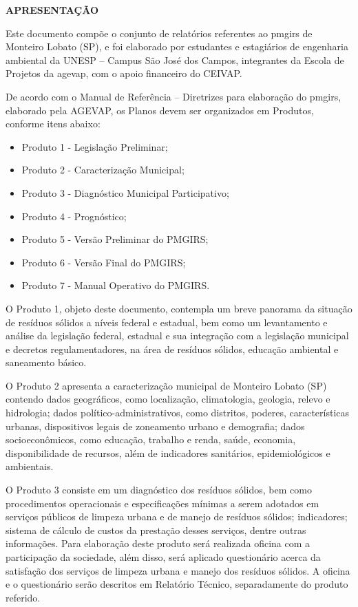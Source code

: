 \begin{center}
    {\bfseries\Large\MakeUppercase{Apresentação}}
\end{center}
Este documento compõe o conjunto de relatórios referentes ao \gls{pmgirs} de Monteiro Lobato (SP), e foi elaborado por estudantes e estagiários de engenharia ambiental da UNESP – Campus São José dos Campos, integrantes da Escola de Projetos da \gls{agevap}, com o apoio financeiro do CEIVAP.

De acordo com o Manual de Referência – Diretrizes para elaboração do \gls{pmgirs}, elaborado pela AGEVAP, os Planos devem ser organizados em Produtos, conforme itens abaixo:
\begin{itemize}
    \item {Produto 1 - Legislação Preliminar;}
    \item {Produto 2 - Caracterização Municipal;}
    \item {Produto 3 - Diagnóstico Municipal Participativo;}
    \item Produto 4 - Prognóstico;
    \item Produto 5 - Versão Preliminar do PMGIRS;
    \item Produto 6 - Versão Final do PMGIRS;
    \item Produto 7 - Manual Operativo do PMGIRS.
\end{itemize}

O Produto 1, objeto deste documento, contempla um breve panorama da situação de resíduos sólidos a níveis federal e estadual, bem como um levantamento e análise da legislação federal, estadual e sua integração com a legislação municipal e decretos regulamentadores, na área de resíduos sólidos, educação ambiental e saneamento básico.

O Produto 2 apresenta a caracterização municipal de Monteiro Lobato (SP) contendo dados geográficos, como localização, climatologia, geologia, relevo e hidrologia; dados político-administrativos, como distritos, poderes, características urbanas, dispositivos legais de zoneamento urbano e demografia; dados socioeconômicos, como educação, trabalho e renda, saúde, economia, disponibilidade de recursos, além de indicadores sanitários, epidemiológicos e ambientais.

O Produto 3 consiste em um diagnóstico dos resíduos sólidos, bem como procedimentos operacionais e especificações mínimas a serem adotados em serviços públicos de limpeza urbana e de manejo de resíduos sólidos; indicadores; sistema de cálculo de custos da prestação desses serviços, dentre outras informações. Para elaboração deste produto será realizada oficina com a participação da sociedade, além disso, será aplicado questionário acerca da satisfação dos serviços de limpeza urbana e manejo dos resíduos sólidos. A oficina e o questionário serão descritos em Relatório Técnico, separadamente do produto referido.

